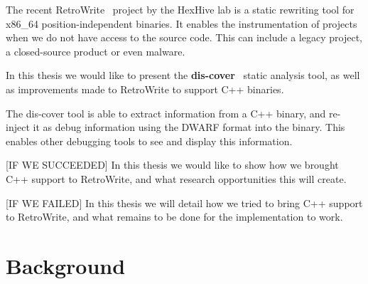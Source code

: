 \documentclass[a4paper,11pt,oneside]{report}
\begin{document}

The recent RetroWrite~\cite{dinesh20oakland} project by the HexHive lab is a 
static rewriting tool for x86\_64 position-independent binaries.
It enables the instrumentation of projects when we do not have access to the 
source code.
This can include a legacy project, a closed-source product or even malware.




In this thesis we would like to present the 
\textbf{dis-cover}~\cite{discovergithub} static analysis tool,
as well as improvements made to RetroWrite to support C++ binaries.



The dis-cover tool is able to extract information from a C++ binary, and 
re-inject it as debug information using the DWARF format into the binary.
This enables other debugging tools to see and display this information.







[IF WE SUCCEEDED]
In this thesis we would like to show how we brought C++ support to RetroWrite, 
and what research opportunities this will create.

[IF WE FAILED]
In this thesis we will detail how we tried to bring C++ support to RetroWrite, 
and what remains to be done for the implementation to work.


\chapter{Background}
\end{document}
